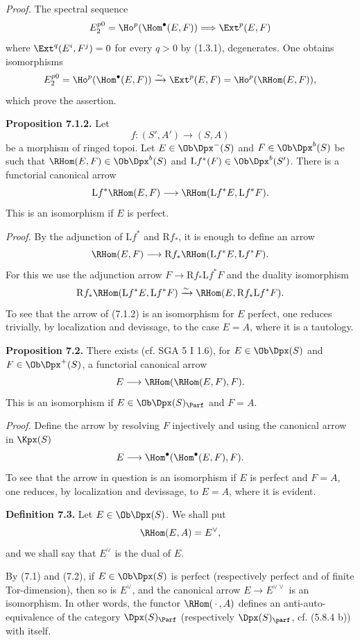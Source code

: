 \emph{Proof.} The spectral sequence
\[
  E_2^{p0}=\Ho^p(\Hom^\bullet(E,F))
  \Longrightarrow \Ext^p(E,F)
\]
where \(\Ext^q(E^i,F^j)=0\) for every \(q>0\) by (1.3.1), degenerates. One obtains isomorphisms
\[
  E_2^{p0}=\Ho^p(\Hom^\bullet(E,F))
  \xrightarrow{\sim}\Ext^p(E,F)=\Ho^p(\RHom(E,F)),
\]
which prove the assertion.

\textbf{Proposition 7.1.2.} Let
\[
  f:(S',A')\longrightarrow(S,A)
\]
be a morphism of ringed topoi. Let \(E\in\Ob\Dpx^-(S)\) and \(F\in\Ob\Dpx^b(S)\) be such that \(\RHom(E,F)\in\Ob\Dpx^b(S)\) and \(\mathrm Lf^*(F)\in\Ob\Dpx^b(S')\). There is a functorial canonical arrow
\[
  \mathrm Lf^*\RHom(E,F)
  \longrightarrow
  \RHom(\mathrm Lf^*E,\mathrm Lf^*F).
\]
This is an isomorphism if \(E\) is perfect.

\emph{Proof.} By the adjunction of \(\mathrm Lf^*\) and \(\mathrm Rf_*\), it is enough to define an arrow
\[
  \RHom(E,F)
  \longrightarrow
  \mathrm Rf_*\RHom(\mathrm Lf^*E,\mathrm Lf^*F).
\]
For this we use the adjunction arrow \(F\to\mathrm Rf_*\mathrm Lf^*F\) and the duality isomorphism
\[
  \mathrm Rf_*\RHom(\mathrm Lf^*E,\mathrm Lf^*F)
  \xrightarrow{\sim}
  \RHom(E,\mathrm Rf_*\mathrm Lf^*F).
\]
To see that the arrow of (7.1.2) is an isomorphism for \(E\) perfect, one reduces trivially, by localization and devissage, to the case \(E=A\), where it is a tautology.

\textbf{Proposition 7.2.} There exists (cf. SGA 5 I 1.6), for \(E\in\Ob\Dpx(S)\) and \(F\in\Ob\Dpx^+(S)\), a functorial canonical arrow
\[
  E\longrightarrow\RHom(\RHom(E,F),F).
\]
This is an isomorphism if \(E\in\Ob\Dpx(S)_{\Parf}\) and \(F=A\).

\emph{Proof.} Define the arrow by resolving \(F\) injectively and using the canonical arrow in \(\Kpx(S)\)
\[
  E\longrightarrow \Hom^\bullet(\Hom^\bullet(E,F),F).
\]
To see that the arrow in question is an isomorphism if \(E\) is perfect and \(F=A\), one reduces, by localization and devissage, to \(E=A\), where it is evident.

\textbf{Definition 7.3.} Let \(E\in\Ob\Dpx(S)\). We shall put
\[
  \RHom(E,A)=E^\vee,
\]
and we shall say that \(E^\vee\) is the dual of \(E\).

By (7.1) and (7.2), if \(E\in\Ob\Dpx(S)\) is perfect (respectively perfect and of finite Tor-dimension), then so is \(E^\vee\), and the canonical arrow \(E\to E^{\vee\vee}\) is an isomorphism. In other words, the functor \(\RHom(\,\cdot\,,A)\) defines an anti-auto-equivalence of the category \(\Dpx(S)_{\Parf}\) (respectively \(\Dpx(S)_{\parf}\), cf. (5.8.4 b)) with itself.

